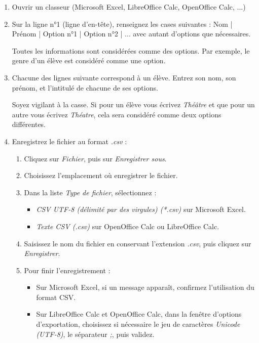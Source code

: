\documentclass[11pt,a4paper]{article}
\begin{document}
\begin{enumerate}
  \item Ouvrir un classeur (Microsoft Excel, LibreOffice Calc, OpenOffice Calc, ...)
  \item Sur la ligne n°1 (ligne d'en-tête), renseignez les cases suivantes : Nom | Prénom | Option n°1 | Option n°2 | ... avec autant d'options que nécessaires. \begin{astuce}Toutes les informations sont considérées comme des options. Par exemple, le genre d'un élève est considéré comme une option.\end{astuce}
  \item Chacune des lignes suivante correspond à un élève. Entrez son nom, son prénom, et l'intitulé de chacune de ses options. \begin{attention}Soyez vigilant à la casse. Si pour un élève vous écrivez \textit{Théâtre} et que pour un autre vous écrivez \textit{Théatre}, cela sera considéré comme deux options différentes.\end{attention}
  \item Enregistrez le fichier au format \textit{.csv} :
  \begin{enumerate}
    \item Cliquez sur \textit{Fichier}, puis sur \textit{Enregistrer sous}.
    \item Choisissez l'emplacement où enregistrer le fichier.
    \item Dans la liste \textit{Type de fichier}, sélectionnez :
    \begin{itemize}
      \item \textit{CSV UTF-8 (délimité par des virgules) (*.csv)} sur Microsoft Excel.
      \item \textit{Texte CSV (.csv)} sur OpenOffice Calc ou LibreOffice Calc.
    \end{itemize}
    \item Saisissez le nom du fichier en conservant l'extension \textit{.csv}, puis cliquez sur \textit{Enregistrer}.
    \item Pour finir l'enregistrement :
    \begin{itemize}
      \item Sur Microsoft Excel, si un message apparaît, confirmez l'utilisation du format CSV.
      \item Sur LibreOffice Calc et OpenOffice Calc, dans la fenêtre d'options d'exportation, choisissez si nécessaire le jeu de caractères \textit{Unicode (UTF-8)}, le séparateur \textit{;}, puis validez.
    \end{itemize}
  \end{enumerate}
\end{enumerate}
\end{document}
